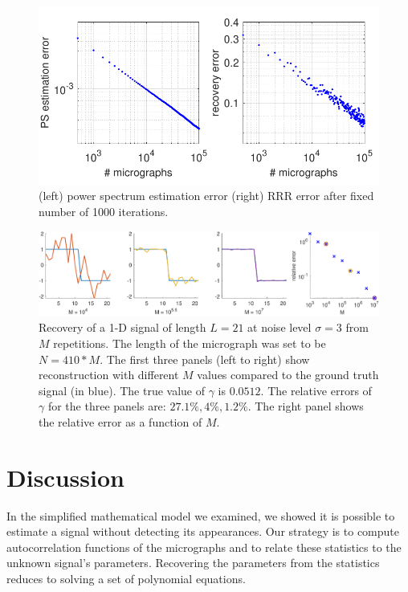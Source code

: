 \documentclass[9pt,twocolumn,twoside,lineno]{pnas-new}
\begin{document}
\begin{figure}[h]
	\centering
	\includegraphics[scale=.68]{Einstein_progress} (left) power spectrum estimation error (right) RRR error after fixed number of 1000 iterations.
\end{figure}



\begin{figure}[h!]
	\centering
	\includegraphics[scale=0.7]{1D_example}
	\caption{\label{fig:1D_example} Recovery of a 1-D signal of length $L=21$ at noise level $\sigma = 3$ from $M$ repetitions. The length of the micrograph was set to be $N = 410*M$. The first three panels (left to right) show reconstruction with different $M$ values compared to the ground truth signal (in blue).
		The true value of $\gamma$ is $0.0512$.
		   The relative errors of $\gamma$ for the three panels are: $27.1\%,4\%,1.2\%$. The right panel shows the relative error as a function of $M$.
	}
\end{figure}


\section{Discussion}

In the simplified mathematical model we examined, we showed it is possible to estimate a signal without detecting its appearances.  
Our strategy is to compute autocorrelation functions of the micrographs and to relate these statistics to the unknown signal's parameters. Recovering the parameters from the statistics reduces to solving a set of polynomial equations. 
\end{document}
